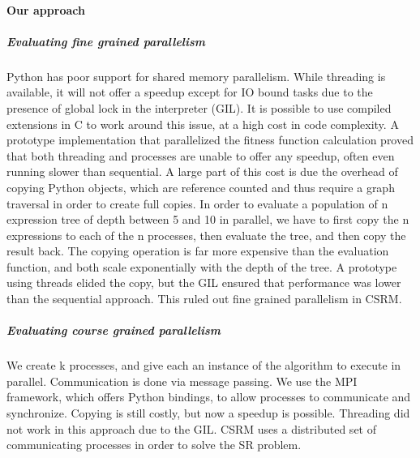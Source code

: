 \paragraph{Our approach}
\subparagraph{Evaluating fine grained parallelism}
Python has poor support for shared memory parallelism. While threading is available, it will not offer a speedup except for IO bound tasks due to the presence of global lock in the interpreter (GIL). It is possible to use compiled extensions in C to work around this issue, at a high cost in code complexity. A prototype implementation that parallelized the fitness function calculation proved that both threading and processes are unable to offer any speedup, often even running slower than sequential. A large part of this cost is due the overhead of copying Python objects, which are reference counted and thus require a graph traversal in order to create full copies. In order to evaluate a population of n expression tree of depth between 5 and 10 in parallel, we have to first copy the n expressions to each of the n processes, then evaluate the tree, and then copy the result back. The copying operation is far more expensive than the evaluation function, and both scale exponentially with the depth of the tree. A prototype using threads elided the copy, but the GIL ensured that performance was lower than the sequential approach.
This ruled out fine grained parallelism in CSRM.
\subparagraph{Evaluating course grained parallelism}
We create k processes, and give each an instance of the algorithm to execute in parallel. Communication is done via message passing. We use the MPI framework, which offers Python bindings, to allow processes to communicate and synchronize. Copying is still costly, but now a speedup is possible. Threading did not work in this approach due to the GIL.
CSRM uses a distributed set of communicating processes in order to solve the SR problem.

